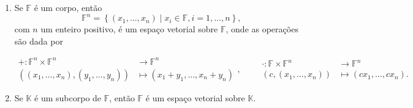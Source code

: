 \begin{example}\leavevmode
	\begin{enumerate}
		\item
		      Se $\mathbb{F}$ é um corpo, então
		      \[
			      \mathbb{F}^{n}=
			      \left\{
			      \left(x_{1},\dotsc,x_{n}\right)
			      \mid x_{i}\in\mathbb{F},
			      i=1,\dotsc,n
			      \right\},
		      \]
		      com $n$ um enteiro positivo, é um espaço vetorial sobre
		      $\mathbb{F}$, onde as operações são dada por

		      \[
			      \begin{aligned}
				      +\colon
				      \mathbb{F}^{n}\times
				      \mathbb{F}^{n} & \longrightarrow
				      \mathbb{F}^{n}                   \\
				      \left(
				      \left(x_{1},\dotsc,x_{n}\right),
				      \left(y_{1},\dotsc,y_{n}\right)
				      \right)        & \longmapsto
				      \left(x_{1}+y_{1},\dotsc,x_{n}+y_{n}\right)
			      \end{aligned},\qquad
			      \begin{aligned}
				      \cdot\colon
				      \mathbb{F}\times
				      \mathbb{F}^{n}                                 & \longrightarrow
				      \mathbb{F}^{n}                                                   \\
				      \left(c,\left(x_{1},\dotsc,x_{n}\right)\right) & \longmapsto
				      \left(cx_{1},\dotsc,cx_{n}\right).
			      \end{aligned}
		      \]

		\item

		      Se $\mathbb{K}$ é um subcorpo de $\mathbb{F}$, então
		      $\mathbb{F}$ é um espaço vetorial sobre $\mathbb{K}$.


\end{enumerate}
\end{example}
